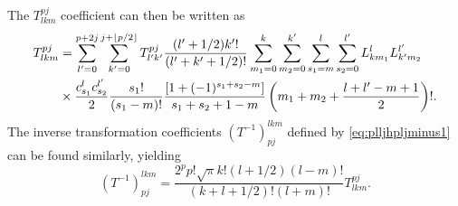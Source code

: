 %
The $T_{lkm}^{pj}$ coefficient can then be written as
%
\begin{align}
    T_{lkm}^{pj}&=\sum_{l'=0}^{p+2j}\sum_{k'=0}^{j+\lfloor p/2\rfloor} T_{l'k'}^{pj}\frac{(l'+1/2)k'!}{(l'+k'+1/2)!} \sum_{m_1=0}^k\sum_{m_2=0}^{k'}\sum_{s_1=m}^l\sum_{s_2=0}^{l'}L_{k m_1}^l L_{k' m_2}^{l'}\nonumber\\
    &\times \frac{c_{s_1}^l c_{s_2}^{l'}}{2} \frac{s_1!}{(s_1-m)!} \frac{\left[1+(-1)^{s_1+s_2-m}\right]}{s_1+s_2+1-m}\left(m_1+m_2+\frac{l+l'-m+1}{2}\right)!.
\end{align}
%
The inverse transformation coefficients $(T^{-1})^{lkm}_{pj}$ defined by \cref{eq:plljhpljminus1} can be found similarly, yielding
%
\begin{equation}
    (T^{-1})^{lkm}_{pj}=\frac{2^p p! \sqrt{\pi} k! (l+1/2)(l-m)!}{(k+l+1/2)!(l+m)!}T_{lkm}^{pj}.
\end{equation}
